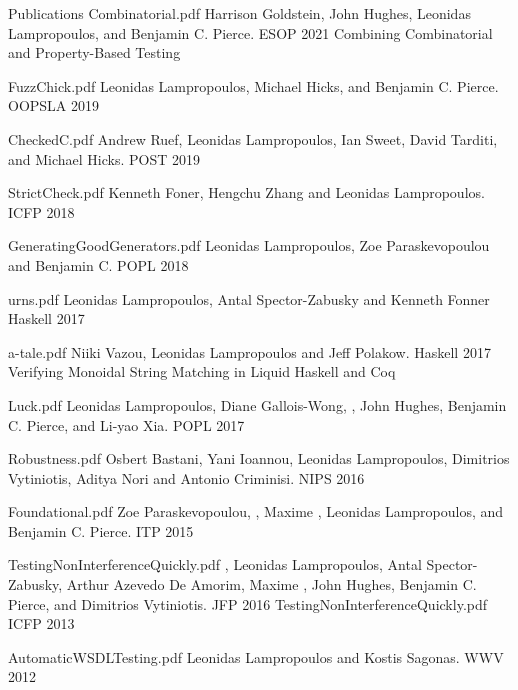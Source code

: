 \documentclass{resume} %
\begin{document}
\begin{rSection}{Publications}
    {Combinatorial.pdf}
    {Harrison Goldstein, John Hughes, Leonidas Lampropoulos, and Benjamin C. Pierce.}
    {ESOP 2021}
    {Combining Combinatorial and Property-Based Testing}    
    
    {FuzzChick.pdf}
    {Leonidas Lampropoulos, Michael Hicks, and Benjamin C. Pierce.}
    {OOPSLA 2019}
    
    {CheckedC.pdf}
    {Andrew Ruef, Leonidas Lampropoulos, Ian Sweet, David Tarditi, and Michael Hicks.}
    {POST 2019}

    {StrictCheck.pdf}
    {Kenneth Foner, Hengchu Zhang and Leonidas Lampropoulos.}
    {ICFP 2018}

    {GeneratingGoodGenerators.pdf}
    {Leonidas Lampropoulos, Zoe Paraskevopoulou and Benjamin C.}
    {POPL 2018}

    {urns.pdf}
    {Leonidas Lampropoulos, Antal Spector-Zabusky and Kenneth Fonner}
    {Haskell 2017}

    {a-tale.pdf}
    {Niiki Vazou, Leonidas Lampropoulos and Jeff Polakow.}
    {Haskell 2017}
    {Verifying Monoidal String Matching in Liquid Haskell and Coq}

    {Luck.pdf}
    {Leonidas Lampropoulos, Diane Gallois-Wong, \Catalin \Hritcu, John Hughes, Benjamin C. Pierce, and Li-yao Xia.}
    {POPL 2017}

    {Robustness.pdf}
    {Osbert Bastani, Yani Ioannou, Leonidas Lampropoulos, Dimitrios Vytiniotis, Aditya Nori and Antonio Criminisi.}
    {NIPS 2016}

    {Foundational.pdf}
    {Zoe Paraskevopoulou, \Catalin \Hritcu, Maxime \Denes, Leonidas Lampropoulos, and Benjamin C. Pierce.}
    {ITP 2015}
    
    {TestingNonInterferenceQuickly.pdf}
    {\Catalin \Hritcu, Leonidas Lampropoulos, Antal Spector-Zabusky, Arthur
    Azevedo De Amorim, Maxime \Denes, John Hughes, Benjamin C. Pierce, and Dimitrios
    Vytiniotis.}
    {JFP 2016}
    {TestingNonInterferenceQuickly.pdf}
    {ICFP 2013}

    {AutomaticWSDLTesting.pdf}
    {Leonidas Lampropoulos and Kostis Sagonas.}
    {WWV 2012}
   
\end{rSection}
\end{document}
